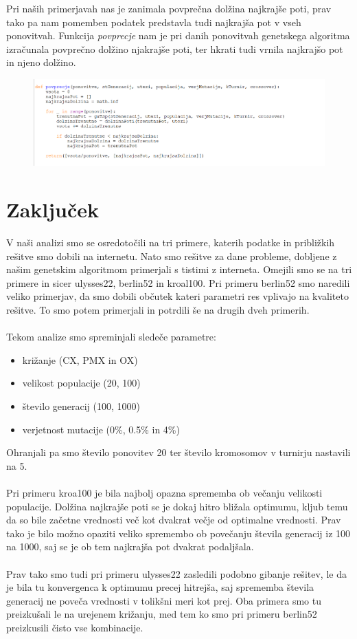 \documentclass[12pt,a4paper]{amsart}
\theoremstyle{definition} %
\theoremstyle{plain} %
\begin{document}
Pri naših primerjavah nas je zanimala povprečna dolžina najkrajše poti, prav tako pa nam pomemben podatek predstavla tudi najkrajša pot v vseh ponovitvah. Funkcija \textit{povprecje} nam je pri danih ponovitvah genetskega algoritma izračunala povprečno dolžino njakrajše poti, ter hkrati tudi vrnila najkrajšo pot in njeno dolžino.

\begin{figure}[ht]
\centering
\includegraphics[width=1\textwidth]{povprecje}
\end{figure}
\newpage

\section{Zaključek}

V naši analizi smo se osredotočili na tri primere, katerih podatke in približkih rešitve smo dobili na internetu. Nato smo rešitve za dane probleme, dobljene z našim genetskim algoritmom primerjali s tistimi z interneta. Omejili smo se na tri primere in sicer ulysses22, berlin52 in kroal100. Pri primeru berlin52 smo naredili veliko primerjav, da smo dobili občutek kateri parametri res vplivajo na kvaliteto rešitve. To smo potem primerjali in potrdili še na drugih dveh primerih. 
\\
\\
Tekom analize smo spreminjali sledeče parametre:
\begin{itemize}
\item križanje (CX, PMX in OX)
\item velikost populacije (20, 100)
\item število generacij (100, 1000)
\item verjetnost mutacije (0\%, 0.5\% in 4\%)

 \end{itemize}
Ohranjali pa smo število ponovitev 20 ter število kromosomov v turnirju nastavili na 5.
\\
\\
Pri primeru kroa100 je bila najbolj opazna sprememba ob večanju velikosti populacije. Dolžina najkrajše poti se je dokaj hitro bližala optimumu, kljub temu da so bile začetne vrednosti več kot dvakrat večje od optimalne vrednosti. 
Prav tako je bilo možno opaziti veliko spremembo ob povečanju števila generacij iz 100 na 1000, saj se je ob tem najkrajša pot dvakrat podaljšala.
\\
\\
Prav tako smo tudi pri primeru ulysses22 zasledili podobno gibanje rešitev, le da je bila tu konvergenca k optimumu precej hitrejša, saj sprememba števila generacij ne poveča vrednosti v tolikšni meri kot prej. Oba primera smo tu preizkušali le na urejenem križanju, med tem ko smo pri primeru berlin52 preizkusili čisto vse kombinacije. 
\end{document}
